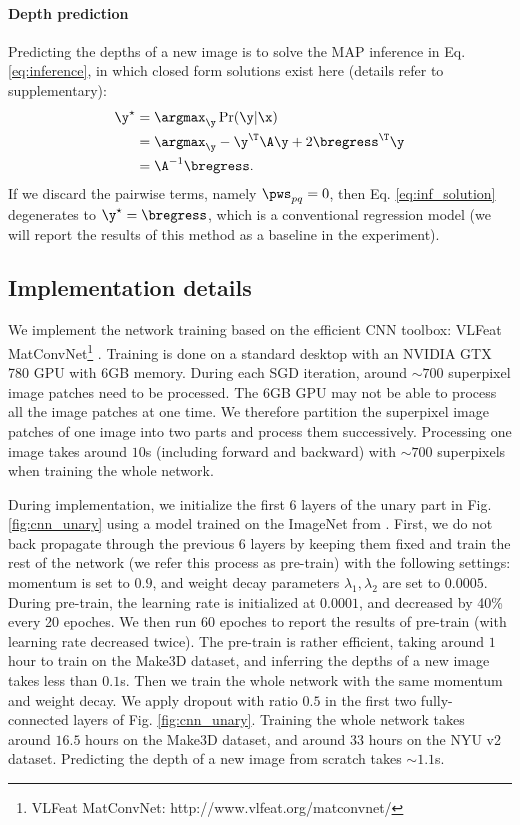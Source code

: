 \paragraph{Depth prediction}
Predicting the depths of a new image is to solve the MAP inference in Eq. \eqref{eq:inference}, in which closed form solutions exist here (details refer to supplementary): %
\begin{align} \label{eq:inf_solution}
\y^{\star}&=\argmax_{\y} \Pr(\y|\x)  \\ \notag
&= \argmax_{\y} -\y^\T \A \y + 2\bregress^\T \y  \\  \notag
&= \A^{-1} \bregress.
\end{align} 
If we discard the pairwise terms, namely $\pws_{pq}=0$, then Eq. \eqref{eq:inf_solution} degenerates to $\y^{\star}=\bregress$, which is a conventional regression model (we will report the results of this method as a baseline in the experiment). 


%
%


%












\subsection{Implementation details}
We implement the network training based on the efficient CNN toolbox: VLFeat MatConvNet\footnote{VLFeat MatConvNet: http://www.vlfeat.org/matconvnet/} \cite{matconvnet}. 
Training is done on a standard desktop with an NVIDIA GTX 780 GPU with 6GB memory. 
%
%
During each SGD iteration, around $\sim 700$ superpixel image patches need to be processed.
The 6GB GPU may not be able to process all the image patches at one time.
We therefore partition the superpixel image patches of one image into two parts and process them successively.
%
%
%
%
Processing one image takes around $10$s (including forward and backward) with $\sim 700$ superpixels when training the whole network.


During implementation, we initialize the first 6 layers of the unary part in Fig. \ref{fig:cnn_unary} using a \cnn model trained on the ImageNet from \cite{vgg_bmvc14}.
First, we do not back propagate through the previous 6 layers by keeping them fixed and train the rest of the network (we refer this process as pre-train) with the following settings: 
%
momentum is set to $0.9$, and weight decay parameters $\lambda_1, \lambda_2$ are set to $0.0005$.
During pre-train, the learning rate is initialized at $0.0001$,
and decreased by 40\% every 20 epoches. 
%
%
We then run 60 epoches to report the results of pre-train (with learning rate decreased twice).
The pre-train is rather efficient, taking around $1$ hour to train on the Make3D dataset, and inferring the depths of a new image takes less than $0.1$s.
Then we train 
%
the whole network with the same momentum and weight decay.
%
We apply dropout with ratio $0.5$ in the first two fully-connected layers of Fig. \ref{fig:cnn_unary}. 
Training the whole network takes around $16.5$ hours on the Make3D dataset, and around $33$ hours on the NYU v2 dataset. Predicting the depth of a new image from scratch takes $\sim 1.1$s.